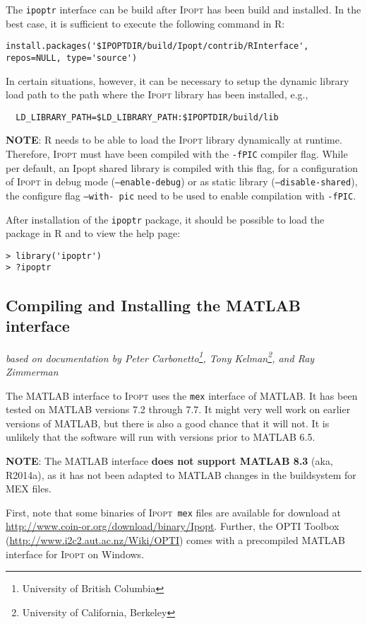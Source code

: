 \documentclass[10pt]{article}
\newcommand{\Ipopt}{\textsc{Ipopt}\xspace}
\newcommand{\ipoptr}{\texttt{ipoptr}\xspace}
\newcommand{\Matlab}{\textsc{MATLAB}\xspace}
\begin{document}
The \ipoptr interface can be build after \Ipopt has been build and installed.
In the best case, it is sufficient to execute the following command in R:
\begin{verbatim}
install.packages('$IPOPTDIR/build/Ipopt/contrib/RInterface', repos=NULL, type='source')
\end{verbatim}

In certain situations, however, it can be necessary to setup the dynamic 
library load path to the path where the \Ipopt library has been installed, 
e.g.,
\begin{verbatim}
  LD_LIBRARY_PATH=$LD_LIBRARY_PATH:$IPOPTDIR/build/lib
\end{verbatim}

\textbf{NOTE}: R needs to be able to load the \Ipopt library dynamically 
at runtime. Therefore, \Ipopt must have been compiled with the {\tt -fPIC} 
compiler flag. While per default, an Ipopt shared library is compiled with 
this flag, for a configuration of \Ipopt in debug mode ({\tt --enable-debug}) 
or as static library ({\tt --disable-shared}), the configure flag {\tt --with-
pic} need to be used to enable compilation with {\tt -fPIC}.

After installation of the \ipoptr package, it should be possible to load the 
package in R and to view the help page:
\begin{verbatim}
> library('ipoptr')
> ?ipoptr
\end{verbatim}

\subsection{Compiling and Installing the \Matlab interface}
\label{sec.matlab.build}
\hfill \textit{based on documentation by Peter Carbonetto\footnote{University of British Columbia}, Tony Kelman\footnote{University of California, Berkeley}, and Ray Zimmerman}%
\medskip

The \Matlab interface to \Ipopt uses the {\tt mex} interface of \Matlab.
It has been tested on \Matlab versions 7.2 through 7.7. It might very well 
work on earlier versions of \Matlab, but there is also a good chance that it 
will not. It is unlikely that the software will run with versions prior to 
\Matlab 6.5.

\textbf{NOTE}: The \Matlab interface \textbf{does not support \Matlab 8.3} (aka, R2014a), as
it has not been adapted to \Matlab changes in the buildsystem for MEX files.

First, note that some binaries of \Ipopt\ {\tt mex} files are available for download at
\url{http://www.coin-or.org/download/binary/Ipopt}.
Further, the OPTI Toolbox (\url{http://www.i2c2.aut.ac.nz/Wiki/OPTI}) comes with a 
precompiled \Matlab interface for \Ipopt on Windows.
\end{document}
